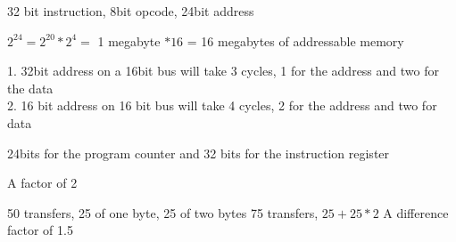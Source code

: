 \documentclass[12pt,largemargins]{homework}
\begin{document}
32 bit instruction, 8bit opcode, 24bit address\\
\begin{alphaparts}
\item
$2^24=2^20*2^4=$ 1 megabyte $* 16$ = 16 megabytes of addressable memory\\
\item
1. 32bit address on a 16bit bus will take 3 cycles, 1 for the address and two for the data \\
2. 16 bit address on 16 bit bus will take 4 cycles, 2 for the address and two for data\\
\item
24bits for the program counter and 32 bits for the instruction register\\
\end{alphaparts}
\newpage
{}
\begin{alphaparts}
\item 
A factor of 2
\item
50 transfers, 25 of one byte, 25 of two bytes
75 transfers, $25 + 25 *2$
A difference factor of 1.5
\end{alphaparts}
 \\
\end{document}
